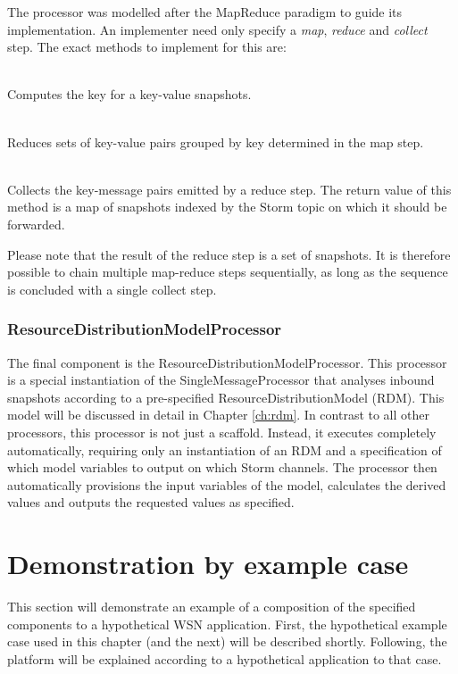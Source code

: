 The processor was modelled after the MapReduce paradigm \cite{mapreduce} to guide its implementation. An implementer need only specify a \emph{map}, \emph{reduce} and \emph{collect} step.  The exact methods to implement for this are: 
\begin{description}[font=\normalfont]
\item[\emph{map(Message m) : String}] \hfill \\ Computes the key for a key-value snapshots.
\item[\emph{reduce(String key, List\textless Message\textgreater\ l) : Message}] \hfill \\ Reduces sets of key-value pairs grouped by key determined in the map step.
\item[\emph{collect(Map\textless String,Message\textgreater\ m) : Map\textless String,Message\textgreater}] \hfill \\ Collects the key-message pairs emitted by a reduce step. The return value of this method is a map of snapshots indexed by the Storm topic on which it should be forwarded.
\end{description}
Please note that the result of the reduce step is a set of snapshots. It is therefore possible to chain multiple map-reduce steps sequentially, as long as the sequence is concluded with a single collect step.

\subsubsection*{ResourceDistributionModelProcessor}
The final component is the ResourceDistributionModelProcessor. This processor is a special instantiation of the SingleMessageProcessor that analyses inbound snapshots according to a pre-specified ResourceDistributionModel (RDM). This model will be discussed in detail in Chapter \ref{ch:rdm}. In contrast to all other processors, this processor is not just a scaffold. Instead, it executes completely automatically, requiring only an instantiation of an RDM and a specification of which model variables to output on which Storm channels. The processor then automatically provisions the input variables of the model, calculates the derived values and outputs the requested values as specified.

\section{Demonstration by example case}
\label{sec:example_application_topology}
This section will demonstrate an example of a composition of the specified components to a hypothetical WSN application. First, the hypothetical example case used in this chapter (and the next) will be described shortly. Following, the platform will be explained according to a hypothetical application to that case.

